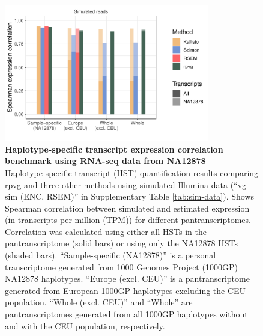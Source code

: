 \documentclass[11pt]{ucthesis}
\begin{document}
\begin{figure}[H]
\begin{center}
\includegraphics[width=0.8\textwidth]{mpmapfigures/figureS6.pdf}
\caption{\textbf{Haplotype-specific transcript expression correlation benchmark using RNA-seq data from NA12878} \\
Haplotype-specific transcript (HST) quantification results comparing rpvg and three other methods using simulated Illumina data (``vg sim (ENC, RSEM)'' in Supplementary Table \ref{tab:sim-data}). Shows Spearman correlation between simulated and estimated expression (in transcripts per million (TPM)) for different pantranscriptomes. Correlation was calculated using either all HSTs in the pantranscriptome (solid bars) or using only the NA12878 HSTs (shaded bars). ``Sample-specific (NA12878)'' is a personal transcriptome generated from 1000 Genomes Project (1000GP) NA12878 haplotypes. ``Europe (excl. CEU)'' is a pantranscriptome generated from European 1000GP haplotypes excluding the CEU population. ``Whole (excl. CEU)'' and ``Whole'' are pantranscriptomes generated from all 1000GP haplotypes without and with the CEU population, respectively. 
} \label{fig:expression-corr}
\end{center}
\end{figure}
\end{document}

